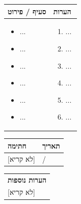 \documentclass[UTF8,10pt,a4paper,fontset=fandol]{ctexart}
\newcommand{\fieldvalue}[1]{#1}
\newcommand{\handwritten}[1]{#1}
\begin{document}
\begin{tabularx}{\textwidth}{|p{}|X|}
\hline
\textbf{סעיף / פירוט}
&
\textbf{הערות}\\
\hline
\begin{itemize}
  \item[$\square$] ...
  \item[$\square$] ...
  \item[$\square$] ...
  \item[$\square$] ...
  \item[$\square$] ...
  \item[$\square$] ...
\end{itemize}
&
\begin{enumerate}
  \item ...
  \item ...
  \item ...
  \item ...
  \item ...
  \item ...
\end{enumerate}
\\
\hline
\end{tabularx}

\vspace{0.5em}

\begin{tabularx}{\textwidth}{|X|p{}|}
\hline
\textbf{חתימה}
&
\textbf{תאריך}\\
\hline
\fieldvalue{\handwritten{[לא קריא]}}
&
\fieldvalue{\handwritten{/}}
\\
\hline
\end{tabularx}

\vspace{0.5em}

\begin{tabularx}{\textwidth}{|X|}
\hline
\textbf{הערות נוספות}\\[1.5em]
\fieldvalue{\handwritten{[לא קריא]}}\\[2em]
\hline
\end{tabularx}

\end{document}
